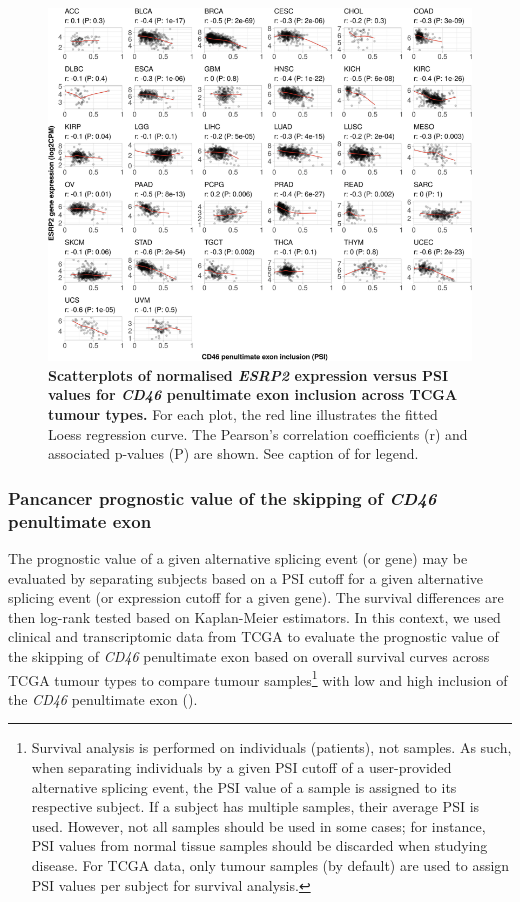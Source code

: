 \begin{figure}[!h]
  \includegraphics[width=1\textwidth]{images/psichomics/10-tcga-esrp2}
  \centering
  \caption[\emph{ESRP2} expression versus \emph{CD46} penultimate exon PSI across TCGA tumour types]{\textbf{Scatterplots of normalised \emph{ESRP2} expression versus PSI values for \emph{CD46} penultimate exon inclusion across TCGA tumour types.} For each plot, the red line illustrates the fitted Loess regression curve. The Pearson’s correlation coefficients (r) and associated p-values (P) are shown. See caption of  for legend.}
  \label{fig:psichomics-tcga-esrp2}
\end{figure}

\subsubsection{Pancancer prognostic value of the skipping of \emph{CD46} penultimate exon}

The prognostic value of a given alternative splicing event (or gene) may be evaluated by separating subjects based on a PSI cutoff for a given alternative splicing event (or expression cutoff for a given gene). The survival differences are then log-rank tested based on Kaplan-Meier estimators. In this context, we used clinical and transcriptomic data from TCGA to evaluate the prognostic value of the skipping of \emph{CD46} penultimate exon based on overall survival curves across TCGA tumour types to compare tumour samples\footnote{Survival analysis is performed on individuals (patients), not samples. As such, when separating individuals by a given PSI cutoff of a user-provided alternative splicing event, the PSI value of a sample is assigned to its respective subject. If a subject has multiple samples, their average PSI is used. However, not all samples should be used in some cases; for instance, PSI values from normal tissue samples should be discarded when studying disease. For TCGA data, only tumour samples (by default) are used to assign PSI values per subject for survival analysis.} with low and high inclusion of the \emph{CD46} penultimate exon ().

